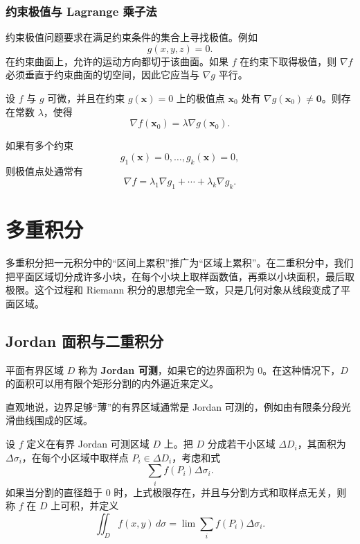 \subsubsection{约束极值与 Lagrange 乘子法}

约束极值问题要求在满足约束条件的集合上寻找极值。例如
\[
    g(x,y,z)=0.
\]
在约束曲面上，允许的运动方向都切于该曲面。如果 $f$ 在约束下取得极值，则 $\nabla f$ 必须垂直于约束曲面的切空间，因此它应当与 $\nabla g$ 平行。

\begin{theorem}
设 $f$ 与 $g$ 可微，并且在约束 $g(\mathbf{x})=0$ 上的极值点 $\mathbf{x}_0$ 处有 $\nabla g(\mathbf{x}_0)\neq\mathbf{0}$。则存在常数 $\lambda$，使得
\[
    \nabla f(\mathbf{x}_0)=\lambda\nabla g(\mathbf{x}_0).
\]
\end{theorem}

如果有多个约束
\[
    g_1(\mathbf{x})=0,
    \dots,
    g_k(\mathbf{x})=0,
\]
则极值点处通常有
\[
    \nabla f=\lambda_1\nabla g_1+\cdots+\lambda_k\nabla g_k.
\]


\section{多重积分}

多重积分把一元积分中的“区间上累积”推广为“区域上累积”。在二重积分中，我们把平面区域切分成许多小块，在每个小块上取样函数值，再乘以小块面积，最后取极限。这个过程和 Riemann 积分的思想完全一致，只是几何对象从线段变成了平面区域。

\subsection{Jordan 面积与二重积分}

\begin{definition}
平面有界区域 $D$ 称为 \textbf{Jordan 可测}，如果它的边界面积为 $0$。在这种情况下，$D$ 的面积可以用有限个矩形分割的内外逼近来定义。
\end{definition}

直观地说，边界足够“薄”的有界区域通常是 Jordan 可测的，例如由有限条分段光滑曲线围成的区域。

\begin{definition}[二重积分]
设 $f$ 定义在有界 Jordan 可测区域 $D$ 上。把 $D$ 分成若干小区域 $\Delta D_i$，其面积为 $\Delta\sigma_i$，在每个小区域中取样点 $P_i\in\Delta D_i$，考虑和式
\[
    \sum_i f(P_i)\Delta\sigma_i.
\]
如果当分割的直径趋于 $0$ 时，上式极限存在，并且与分割方式和取样点无关，则称 $f$ 在 $D$ 上可积，并定义
\[
    \iint_D f(x,y)\,d\sigma
    =\lim \sum_i f(P_i)\Delta\sigma_i.
\]
\end{definition}

